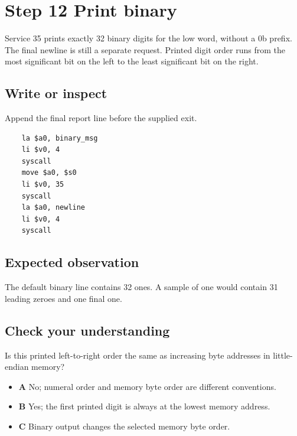 \section{Step 12 Print
  binary}\label{004-bit-inspector-s12-step-12-print-binary}

Service 35 prints exactly 32 binary digits for the low word, without a
0b prefix. The final newline is still a separate request. Printed digit
order runs from the most significant bit on the left to the least
significant bit on the right.

\subsection{Write or
  inspect}\label{004-bit-inspector-s12-write-or-inspect}

Append the final report line before the supplied exit.

\begin{verbatim}
    la $a0, binary_msg
    li $v0, 4
    syscall
    move $a0, $s0
    li $v0, 35
    syscall
    la $a0, newline
    li $v0, 4
    syscall
\end{verbatim}

\subsection{Expected
  observation}\label{004-bit-inspector-s12-expected-observation}

The default binary line contains 32 ones. A sample of one would contain
31 leading zeroes and one final one.

\subsection{Check your
  understanding}\label{004-bit-inspector-s12-check-your-understanding}

Is this printed left-to-right order the same as increasing byte
addresses in little-endian memory?

\begin{itemize}
  \tightlist
  \item
        \textbf{A} No; numeral order and memory byte order are different
        conventions.
  \item
        \textbf{B} Yes; the first printed digit is always at the lowest memory
        address.
  \item
        \textbf{C} Binary output changes the selected memory byte order.
\end{itemize}
